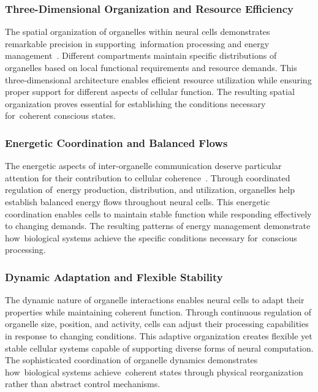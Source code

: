 \subsubsection{Three-Dimensional Organization and Resource Efficiency~~}

The spatial organization of organelles within neural cells demonstrates remarkable precision in supporting~information processing and energy management~\cite{Kapitein2015}. Different compartments maintain specific distributions of organelles based on local functional requirements and resource demands. This three-dimensional architecture enables efficient resource utilization while ensuring proper support for different aspects of cellular function. The resulting spatial organization proves essential for establishing the conditions necessary for~coherent conscious states.

\subsubsection{Energetic Coordination and Balanced Flows~~}

The energetic aspects of inter-organelle communication deserve particular attention for their contribution to cellular coherence~\cite{Picard2014, Ramirez2011}. Through coordinated regulation of~energy production, distribution, and utilization, organelles help establish balanced energy flows throughout neural cells. This energetic coordination enables cells to maintain stable function while responding effectively to changing demands. The resulting patterns of energy management demonstrate how~biological systems achieve the specific conditions necessary for~conscious processing.

\subsubsection{Dynamic Adaptation and Flexible Stability~~}

The dynamic nature of organelle interactions enables neural cells to adapt their properties while maintaining coherent function. Through continuous regulation of organelle size, position, and activity, cells can adjust their processing capabilities in response to changing conditions. This adaptive organization creates flexible yet stable cellular systems capable of supporting diverse forms of neural computation. The sophisticated coordination of organelle dynamics demonstrates how~biological systems achieve~coherent states through physical reorganization rather than abstract control mechanisms.

